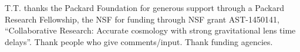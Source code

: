 
\begin{acknowledgements}
T.T. thanks the Packard Foundation for generous support through a Packard Research Fellowship, the NSF for funding through NSF grant AST-1450141, ``Collaborative Research: Accurate cosmology with strong gravitational lens time delays''.	
Thank people who give comments/input. Thank funding agencies.
\end{acknowledgements}



%
%




